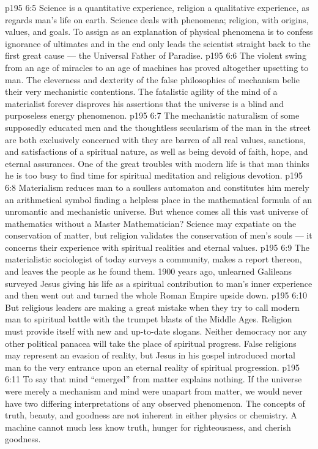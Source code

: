 \vs p195 6:5 Science is a quantitative experience, religion a qualitative experience, as regards man’s life on earth. Science deals with phenomena; religion, with origins, values, and goals. To assign  as an explanation of physical phenomena is to confess ignorance of ultimates and in the end only leads the scientist straight back to the first great cause --- the Universal Father of Paradise.
\vs p195 6:6 The violent swing from an age of miracles to an age of machines has proved altogether upsetting to man. The cleverness and dexterity of the false philosophies of mechanism belie their very mechanistic contentions. The fatalistic agility of the mind of a materialist forever disproves his assertions that the universe is a blind and purposeless energy phenomenon.
\vs p195 6:7 The mechanistic naturalism of some supposedly educated men and the thoughtless secularism of the man in the street are both exclusively concerned with  they are barren of all real values, sanctions, and satisfactions of a spiritual nature, as well as being devoid of faith, hope, and eternal assurances. One of the great troubles with modern life is that man thinks he is too busy to find time for spiritual meditation and religious devotion.
\vs p195 6:8 Materialism reduces man to a soulless automaton and constitutes him merely an arithmetical symbol finding a helpless place in the mathematical formula of an unromantic and mechanistic universe. But whence comes all this vast universe of mathematics without a Master Mathematician? Science may expatiate on the conservation of matter, but religion validates the conservation of men’s souls --- it concerns their experience with spiritual realities and eternal values.
\vs p195 6:9 The materialistic sociologist of today surveys a community, makes a report thereon, and leaves the people as he found them. 1900 years ago, unlearned Galileans surveyed Jesus giving his life as a spiritual contribution to man’s inner experience and then went out and turned the whole Roman Empire upside down.
\vs p195 6:10 But religious leaders are making a great mistake when they try to call modern man to spiritual battle with the trumpet blasts of the Middle Ages. Religion must provide itself with new and up\hyp{}to\hyp{}date slogans. Neither democracy nor any other political panacea will take the place of spiritual progress. False religions may represent an evasion of reality, but Jesus in his gospel introduced mortal man to the very entrance upon an eternal reality of spiritual progression.
\vs p195 6:11 To say that mind “emerged” from matter explains nothing. If the universe were merely a mechanism and mind were unapart from matter, we would never have two differing interpretations of any observed phenomenon. The concepts of truth, beauty, and goodness are not inherent in either physics or chemistry. A machine cannot  much less know truth, hunger for righteousness, and cherish goodness.
